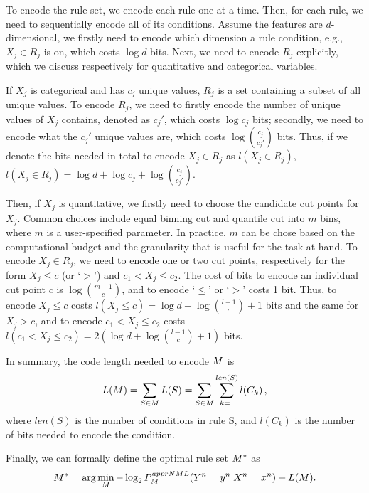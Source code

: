  To encode the rule set, we encode each rule one at a time. Then, for each rule, we need to sequentially encode all of its conditions. Assume the features are $d$-dimensional, we firstly need to encode which dimension a rule condition, e.g., $X_j \in R_j$ is on, which costs $\log d$ bits. Next, we need to encode $R_j$ explicitly, which we discuss respectively for quantitative and categorical variables.

 If $X_j$ is categorical and has $c_j$ unique values, $R_j$ is a set containing a subset of all unique values. To encode $R_j$, we need to firstly encode the number of unique values of $X_j$ contains, denoted as $c_j'$, which costs $\log c_j$ bits; secondly, we need to encode what the $c_j'$ unique values are, which costs $\log {c_j \choose c_j'}$ bits. Thus, if we denote the bits needed in total to encode $X_j \in R_j$ as $l(X_j \in R_j)$, $l(X_j \in R_j) = \log d + \log c_j + \log {c_j \choose c_j'}$. 

 Then, if $X_j$ is quantitative, we firstly need to choose the candidate cut points for $X_j$. Common choices include equal binning cut and quantile cut into $m$ bins, where $m$ is a user-specified parameter. In practice, $m$ can be chose based on the computational budget and the granularity that is useful for the task at hand. To encode $X_j \in R_j$, we need to encode one or two cut points, respectively for the form $X_j \leq c$ (or `$>$') and $c_1 < X_j \leq c_2$. The cost of bits to encode an individual cut point $c$ is $\log {m-1 \choose c}$, and to encode `$\leq$' or `$>$' costs 1 bit. Thus, to encode $X_j \leq c$ costs $l(X_j \leq c) = \log d + \log {l-1 \choose c} + 1$ bits and the same for $X_j > c$, and to encode $c_1 < X_j \leq c_2$ costs $l(c_1< X_j \leq c_2) = 2(\log d + \log {l-1 \choose c} + 1)$ bits. 

 In summary, the code length needed to encode $M$ is 
 \begin{equation}
 	L(M) = \sum_{S \in M} L(S) = \sum_{S \in M} \sum_{k=1}^{len(S)} l(C_k) \, ,
 \end{equation}
 where $len(S)$ is the number of conditions in rule S, and $l(C_k)$ is the number of bits needed to encode the condition. 
 
Finally, we can formally define the optimal rule set $M^*$ as
\begin{equation}
    M^* = \arg \min_{M} -\log_2 P^{apprNML}_{M}(Y^n =y^n | X^n=x^n) + L(M).
\end{equation}
 


